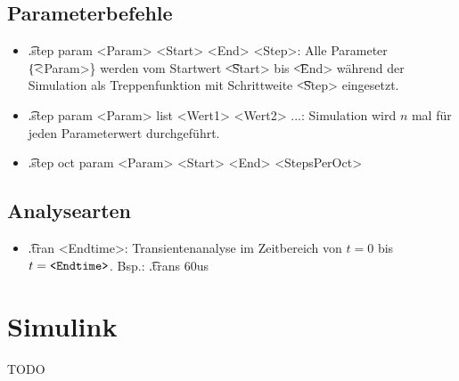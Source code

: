 \documentclass[fs, footer]{latex4ei}
\begin{document}
\begin{multicols*}{4}
\subsection{Parameterbefehle}
\begin{itemize}
	\item \t{.step param <Param> <Start> <End> <Step>}: Alle Parameter \t{\{<Param>\}} werden vom Startwert \t{<Start>} bis \t{<End>} während der Simulation als Treppenfunktion mit Schrittweite \t{<Step>} eingesetzt.
	\item \t{.step param <Param> list <Wert1> <Wert2> ...}: Simulation wird $n$ mal für jeden Parameterwert durchgeführt.
	\item \t{.step oct param <Param> <Start> <End> <StepsPerOct>}
\end{itemize}
\subsection{Analysearten}
\begin{itemize}
	\item \t{.tran <Endtime>}: Transientenanalyse im Zeitbereich von $t = 0$ bis $t = \text{\texttt{<Endtime>}}$. Bsp.: \t{.trans 60us}
\end{itemize}

\section{Simulink}
TODO %

\end{multicols*}
\end{document}
